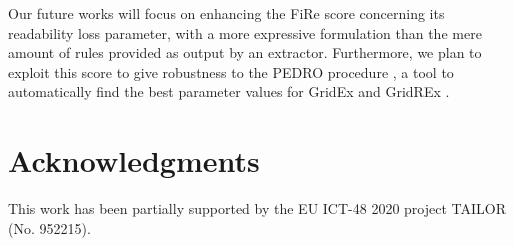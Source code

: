 \documentclass{article}
\newcommand{\gridex}{GridEx}
\newcommand{\gridrex}{GridREx}
\newcommand{\pedro}{\textsc{PEDRO}}
\newcommand{\fire}{FiRe}
\begin{document}
Our future works will focus on enhancing the \fire{} score concerning its readability loss parameter, with a more expressive formulation than the mere amount of rules provided as output by an extractor.
%
Furthermore, we plan to exploit this score to give robustness to the \pedro{} procedure \cite{gridrex-kr2022}, a tool to automatically find the best parameter values for \gridex{} and \gridrex{} \cite{gridrex-kr2022}.

\section*{Acknowledgments}

This work has been partially supported by the EU ICT-48 2020 project TAILOR (No. 952215).




\end{document}
